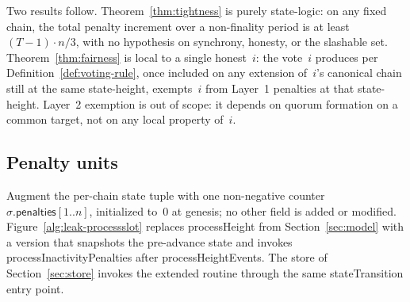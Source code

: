\ifx\litemode\undefined\documentclass{article}\fi
\newcommand{\penalties}{\mathsf{penalties}}
\newcommand{\stateTransition}{\textsf{stateTransition}\xspace}
\newcommand{\processHeight}{\textsf{processHeight}\xspace}
\newcommand{\processHeightEvents}{\textsf{processHeightEvents}\xspace}
\newcommand{\processInactivityPenalties}{\textsf{processInactivityPenalties}\xspace}
\theoremstyle{plain}
\theoremstyle{definition}
\theoremstyle{remark}
\begin{document}
Two results follow.
Theorem~\ref{thm:tightness} is purely state-logic: on any fixed chain, the total penalty increment over a non-finality period is at least $(T-1) \cdot n/3$, with no hypothesis on synchrony, honesty, or the slashable set.
Theorem~\ref{thm:fairness} is local to a single honest~$i$: the vote~$i$ produces per Definition~\ref{def:voting-rule}, once included on any extension of~$i$'s canonical chain still at the same state-height, exempts~$i$ from Layer~1 penalties at that state-height.
Layer~2 exemption is out of scope: it depends on quorum formation on a common target, not on any local property of~$i$.

\subsection{Penalty units}

Augment the per-chain state tuple with one non-negative counter $\sigma.\penalties[1..n]$, initialized to~$0$ at genesis; no other field is added or modified.
Figure~\ref{alg:leak-processslot} replaces \processHeight from Section~\ref{sec:model} with a version that snapshots the pre-advance state and invokes \processInactivityPenalties after \processHeightEvents.
The store of Section~\ref{sec:store} invokes the extended routine through the same \stateTransition entry point.
\end{document}
